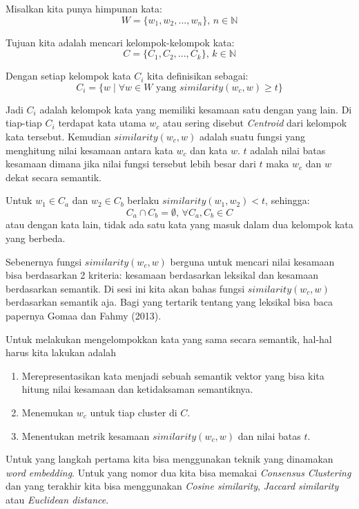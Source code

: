 \documentclass[a4paper,12pt]{tufte-handout}
\newcommand{\N}{\mathbb{N}} %
\begin{document}
Misalkan kita punya himpunan kata:
$$W = \{w_{1}, w_{2}, ..., w_{n}\}\mbox{, } n \in \N $$

Tujuan kita adalah mencari kelompok-kelompok kata: 
$$C = \{C_{1}, C_{2}, ..., C_{k}\}\mbox{, } k \in \N$$ 

Dengan setiap kelompok kata $C_{i}$ kita definisikan sebagai:
$$
C_{i} = \{ w \mid \forall w \in W \mbox{ yang } similarity(w_{c}, w) \geq t\}
$$

Jadi $C_{i}$ adalah kelompok kata yang memiliki kesamaan satu dengan yang 
lain. Di tiap-tiap $C_{i}$ terdapat kata utama $w_{c}$ atau sering disebut
\textit{Centroid} dari kelompok kata 
tersebut.\cite{Tan:2005:IDM:1095618:CH8}
Kemudian $similarity(w_{c}, w)$ adalah suatu fungsi 
yang menghitung nilai kesamaan antara kata $w_{c}$ dan kata $w$.
$t$ adalah nilai batas kesamaan dimana jika nilai fungsi tersebut
lebih besar dari $t$ maka $w_{c}$ dan $w$ dekat secara semantik. 

Untuk $w_{1} \in C_{a}$ dan $w_{2} \in C_{b}$ berlaku 
$similarity(w_{1}, w_{2}) < t$, sehingga:
$$C_{a}\cap{}C_{b}=\emptyset{}\mbox{, }\forall C_{a}, C_{b} \in C$$
atau dengan kata lain, tidak ada satu kata yang masuk dalam dua kelompok kata
yang berbeda.

Sebenernya fungsi $similarity(w_{c}, w)$ berguna untuk mencari
nilai kesamaan bisa berdasarkan 2 kriteria: kesamaan berdasarkan leksikal
dan kesamaan berdasarkan semantik. Di sesi ini kita akan bahas fungsi 
$similarity(w_{c}, w)$ berdasarkan semantik aja. Bagi yang tertarik 
tentang yang leksikal bisa baca papernya Gomaa dan Fahmy (2013).

Untuk melakukan mengelompokkan kata yang sama secara semantik, 
hal-hal harus kita lakukan adalah
\begin{enumerate}
  \item{Merepresentasikan kata menjadi sebuah semantik vektor\cite{jurafskyspeech3rd:CH15}
  yang bisa kita hitung nilai kesamaan dan ketidaksaman semantiknya.}
  \item{Menemukan $w_{c}$ untuk tiap cluster di $C$.}
  \item{Menentukan metrik kesamaan $similarity(w_{c}, w)$ dan nilai
  batas $t$. }
\end{enumerate}

Untuk yang langkah pertama kita bisa menggunakan teknik yang 
dinamakan \textit{word embedding}. Untuk yang nomor dua kita bisa memakai
\textit{Consensus Clustering} dan yang terakhir kita bisa menggunakan
\textit{Cosine similarity}, \textit{Jaccard similarity} 
atau \textit{Euclidean distance}.
\end{document}
